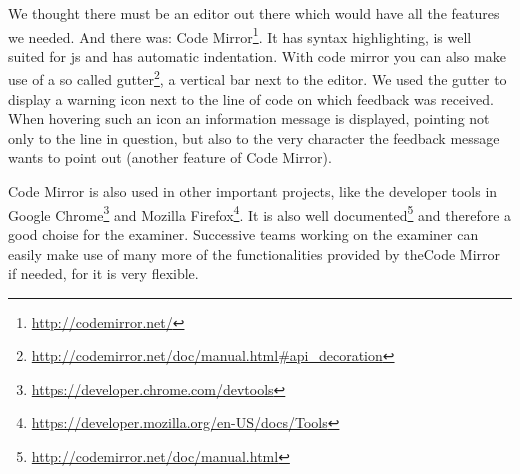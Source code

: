 We thought there must be an editor out there
which would have all the features we needed.
And there was: Code Mirror\footnote{\url{http://codemirror.net/}}.
It has syntax highlighting,
is well suited for \gls{js}
and has automatic indentation.
With code mirror you can also make use of a so called
gutter\footnote{\url{http://codemirror.net/doc/manual.html#api_decoration}},
a vertical bar next to the editor.
We used the gutter to display a warning icon next to the line of code
on which feedback was received.
When hovering such an icon an information message is displayed,
pointing not only to the line in question,
but also to the very character the feedback message wants to point out
(another feature of Code Mirror).

Code Mirror is also used in other important projects,
like the developer tools in
Google Chrome\footnote{\url{https://developer.chrome.com/devtools}} and
Mozilla Firefox\footnote{\url{https://developer.mozilla.org/en-US/docs/Tools}}.
It is also
well documented\footnote{\url{http://codemirror.net/doc/manual.html}}
and therefore a good choise for the \gls{examiner}.
Successive teams working on the \gls{examiner}
can easily make use of many more of
the functionalities provided by theCode Mirror if needed,
for it is very flexible.
